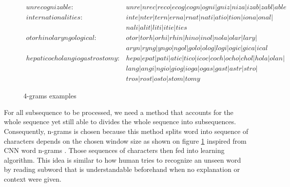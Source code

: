         \begin{figure}
            \begin{align*}
                unrecognizable : &unre \vert nrec \vert reco \vert ecog \vert cogn \vert ogni \vert gniz \vert niza \vert izab \vert zabl \vert able\\
                internationalities : &inte \vert nter \vert tern \vert erna \vert rnat \vert nati \vert atio \vert tion \vert iona \vert onal \vert \\
                &nali \vert alit \vert liti \vert itie \vert ties\\
                otorhinolaryngological : &otor \vert torh \vert orhi \vert rhin \vert hino \vert inol \vert nola \vert olar \vert lary \vert \\
                &aryn \vert ryng \vert yngo \vert ngol \vert golo \vert olog \vert logi \vert ogic \vert gica \vert ical\\
                hepaticocholangiogastrostomy : &hepa \vert epat \vert pati \vert atic \vert tico \vert icoc \vert coch \vert ocho \vert chol \vert hola \vert olan \vert\\
                &lang \vert angi \vert ngio \vert giog \vert ioga \vert ogas \vert gast \vert astr \vert stro \vert\\
                &tros \vert rost \vert osto \vert stom \vert tomy
            \end{align*}
            \caption{4-grams examples}
            \label{fig:4grams}
        \end{figure}

        For all subsequence to be processed, we need a method that
        accounts for the whole sequence yet still able to divides the
        whole sequence into subsequences. Consequently, n-grams is
        chosen because this method splits word into sequence of
        characters depends on the chosen window size as shown on
        figure \ref{fig:4grams} inspired from CNN word n-grams
        \citep{convolutional2014kim}. Those sequences of characters
        then fed into learning algorithm. This idea is similar to how
        human tries to recognize an unseen word by reading subword
        that is understandable beforehand when no explanation or
        context were given. 


